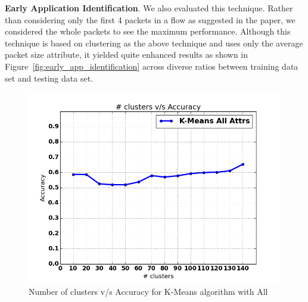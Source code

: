 \documentclass[conference]{IEEEtran}
\begin{document}
\textbf{Early Application Identification}.\cite{Bernaille:2006:EAI:1368436.1368445}
We also evaluated this technique. Rather than considering only the first 4 packets in a flow as suggested in the paper, we considered the whole packets to see the maximum performance.
Although this technique is based on clustering as the above technique and uses only the average packet size attribute, it yielded quite enhanced results as shown in Figure~\ref{fig:early_app_identification} across diverse ratios between training data set and testing data set.

\begin{figure}[!t]
	\centering
	\includegraphics[width=1\columnwidth]{k_means_selected_all}
	\caption{Number of clusters v/s Accuracy for K-Means algorithm with All}
	\label{fig_k_means_all}
\end{figure}
\end{document}
